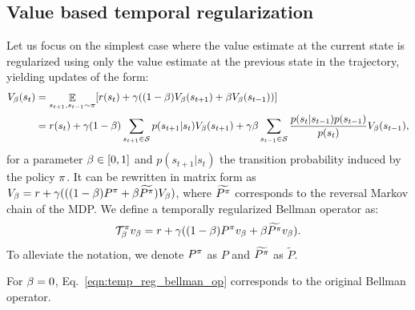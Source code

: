 \subsection{Value based temporal regularization}
Let us focus on the simplest case where the value estimate at the current state is regularized using only the value estimate at the previous state in the trajectory, yielding updates of the form: %
\begin{equation}
    \begin{split}
        V_{\beta}(s_{t}) &= \mathop{\mathbb{E}}_{s_{t+1},s_{t-1} \sim \pi} [r(s_t) + \gamma ((1-\beta)V_{\beta}(s_{t+1}) + \beta V_{\beta}(s_{t-1}))]\\
         &= r(s_t) + \gamma (1-\beta)\sum_{s_{t+1}\in \mathcal{S}} p(s_{t+1}|s_t)V_{\beta}(s_{t+1})
         + \gamma \beta \sum_{s_{t-1} \in \mathcal{S}}\frac{p(s_t|s_{t-1}) p(s_{t-1})}{p(s_t)} V_{\beta}(s_{t-1}),
    \end{split}
\end{equation}
for a parameter $\beta \in [0,1]$ and $p(s_{t+1}|s_t)$ the transition probability induced by the policy $\pi$. It can be rewritten in matrix form as $V_{\beta} = r + \gamma (((1-\beta) P^{\pi} + \beta \widetilde{P^{\pi}})V_{\beta}) $, where $\widetilde{P^{\pi}}$ corresponds to the reversal Markov chain of the MDP.
We define a temporally regularized Bellman operator as:
\begin{equation}
\label{eqn:temp_reg_bellman_op}
    \mathcal{T}^{\pi}_{\beta} v_{\beta} = r + \gamma ((1-\beta) P^{\pi}v_{\beta} + \beta \widetilde{P^{\pi}} v_{\beta}).
\end{equation}
To alleviate the notation, we denote $P^{\pi}$ as $P$ and $\widetilde{P^{\pi}}$ as $\widetilde{P}$.
\begin{remark}
For $\beta =0$, Eq.~\ref{eqn:temp_reg_bellman_op} corresponds to the original Bellman operator.
\end{remark}
